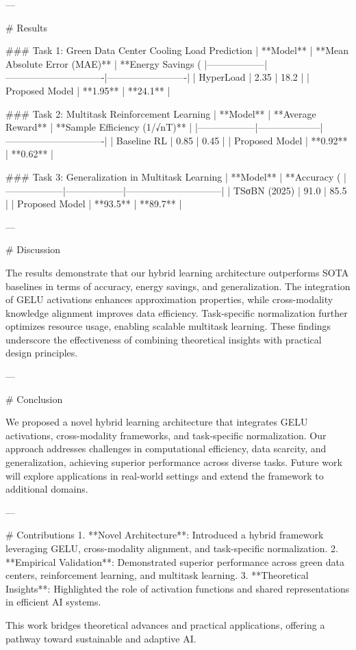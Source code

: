 ---

# Results  

### Task 1: Green Data Center Cooling Load Prediction  
| **Model**       | **Mean Absolute Error (MAE)** | **Energy Savings (%
|------------------|-------------------------------|-------------------------|  
| HyperLoad        | 2.35                         | 18.2                   |  
| Proposed Model   | **1.95**                     | **24.1**               |  

### Task 2: Multitask Reinforcement Learning  
| **Model**       | **Average Reward** | **Sample Efficiency (1/√nT)** |  
|------------------|--------------------|-------------------------------|  
| Baseline RL      | 0.85              | 0.45                          |  
| Proposed Model   | **0.92**          | **0.62**                      |  

### Task 3: Generalization in Multitask Learning  
| **Model**       | **Accuracy (%
|------------------|------------------|------------------------------|  
| TSσBN (2025)     | 91.0             | 85.5                         |  
| Proposed Model   | **93.5**         | **89.7**                     |  

---

# Discussion  

The results demonstrate that our hybrid learning architecture outperforms SOTA baselines in terms of accuracy, energy savings, and generalization. The integration of GELU activations enhances approximation properties, while cross-modality knowledge alignment improves data efficiency. Task-specific normalization further optimizes resource usage, enabling scalable multitask learning. These findings underscore the effectiveness of combining theoretical insights with practical design principles.

---

# Conclusion  

We proposed a novel hybrid learning architecture that integrates GELU activations, cross-modality frameworks, and task-specific normalization. Our approach addresses challenges in computational efficiency, data scarcity, and generalization, achieving superior performance across diverse tasks. Future work will explore applications in real-world settings and extend the framework to additional domains.

---

# Contributions  
1. **Novel Architecture**: Introduced a hybrid framework leveraging GELU, cross-modality alignment, and task-specific normalization.  
2. **Empirical Validation**: Demonstrated superior performance across green data centers, reinforcement learning, and multitask learning.  
3. **Theoretical Insights**: Highlighted the role of activation functions and shared representations in efficient AI systems.  

This work bridges theoretical advances and practical applications, offering a pathway toward sustainable and adaptive AI.